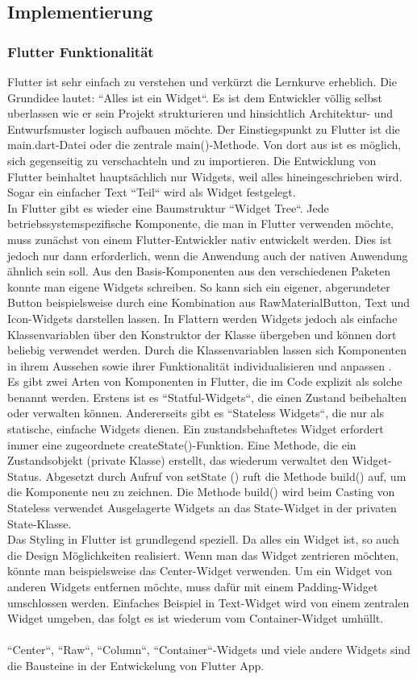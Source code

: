 \subsection{Implementierung}
\subsubsection{Flutter Funktionalität}
Flutter ist sehr einfach zu verstehen und verkürzt die Lernkurve erheblich. Die Grundidee lautet: “Alles ist ein Widget“. Es ist dem Entwickler völlig selbst uberlassen wie er sein Projekt
strukturieren und hinsichtlich Architektur- und Entwurfsmuster logisch aufbauen möchte. Der Einstiegspunkt zu Flutter ist die main.dart-Datei oder die zentrale main()-Methode. Von dort aus ist es möglich, sich gegenseitig zu verschachteln und zu importieren. 
Die Entwicklung von Flutter beinhaltet hauptsächlich nur Widgets, weil alles hineingeschrieben wird.
Sogar ein einfacher Text “Teil“ wird als Widget festgelegt. 
\\
In Flutter gibt es wieder eine Baumstruktur “Widget Tree“. Jede betriebssystemspezifische Komponente, die man in Flutter verwenden möchte, muss zunächst von einem Flutter-Entwickler nativ entwickelt werden. Dies ist jedoch nur dann erforderlich, wenn die Anwendung auch der nativen Anwendung ähnlich sein soll. 
Aus den Basis-Komponenten aus den verschiedenen Paketen konnte man eigene Widgets schreiben. So kann sich ein eigener, abgerundeter Button beispielsweise durch eine Kombination aus RawMaterialButton, Text und Icon-Widgets darstellen lassen.
In Flattern werden Widgets jedoch als einfache Klassenvariablen über den Konstruktor der Klasse übergeben und können dort beliebig verwendet werden.
Durch die Klassenvariablen lassen sich Komponenten in
ihrem Aussehen sowie ihrer Funktionalität individualisieren und anpassen \cite{SDK}.\\
Es gibt zwei Arten von Komponenten in Flutter, die im Code explizit als solche benannt werden. Erstens ist es “Statful-Widgets“, die einen Zustand beibehalten oder verwalten können. Andererseits gibt es “Stateless Widgets“, die nur als statische, einfache Widgets dienen. Ein zustandsbehaftetes Widget erfordert immer eine zugeordnete createState()-Funktion. Eine Methode, die ein Zustandsobjekt (private Klasse) erstellt, das wiederum
verwaltet den Widget-Status. Abgesetzt durch Aufruf von setState ()
ruft die Methode build() auf, um die Komponente neu zu zeichnen. Die Methode build() wird beim Casting von Stateless verwendet
Ausgelagerte Widgets an das State-Widget in der privaten State-Klasse.\\
Das Styling in Flutter ist grundlegend speziell. Da alles ein Widget ist, so auch die Design Möglichkeiten realisiert.
Wenn man das Widget zentrieren möchten, könnte man beispielsweise das Center-Widget verwenden.
Um ein Widget von anderen Widgets entfernen möchte, muss dafür mit einem Padding-Widget umschlossen werden. Einfaches Beispiel in Text-Widget wird von einem zentralen Widget umgeben, das folgt
es ist wiederum vom Container-Widget umhüllt.\\\\
“Center“, “Raw“, “Column“, “Container“-Widgets und viele andere Widgets
sind die Bausteine in der Entwickelung von Flutter App.
